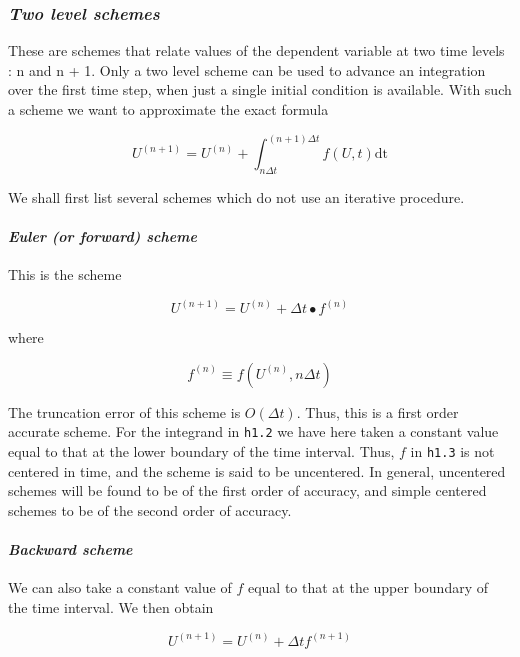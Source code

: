 \subsubsection{\texorpdfstring{\emph{Two level
schemes}}{Two level schemes}}\label{two-level-schemes}

These are schemes that relate values of the dependent variable at two
time levels : n and n + 1. Only a two level scheme can be used to
advance an integration over the first time step, when just a single
initial condition is available. With such a scheme we want to
approximate the exact formula

{\[U^{( n + 1 )} = U^{\left( n \right)} + \int_{n\Delta t}^{(n+1)\Delta t}f\left( U,t \right)\text{dt}\]}

We shall first list several schemes which do not use an iterative
procedure.

\paragraph{\texorpdfstring{\emph{Euler (or forward)
scheme}}{Euler (or forward) scheme}}\label{euler-or-forward-scheme}

This is the scheme

{\[U^{\left( n + 1 \right)} = U^{\left( n \right)} + \Delta t \bullet f^{\left( n \right)}\]}

where

\[f^{\left( n \right)} \equiv f\left( U^{\left( n \right)},n\Delta t \right)\]

The truncation error of this scheme is \(O\left( \Delta t \right)\).
Thus, this is a first order accurate scheme. For the integrand in
\texttt{h1.2} we have here taken a constant value equal to that at the
lower boundary of the time interval. Thus, \(f\) in \texttt{h1.3} is not
centered in time, and the scheme is said to be uncentered. In general,
uncentered schemes will be found to be of the first order of accuracy,
and simple centered schemes to be of the second order of accuracy.

\paragraph{\texorpdfstring{\emph{Backward
scheme}}{Backward scheme}}\label{backward-scheme}

We can also take a constant value of \(f\) equal to that at the upper
boundary of the time interval. We then obtain

{\[U^{( n + 1 )} = U^{( n )} + \Delta t  f^{\left( n + 1 \right)}\]}

